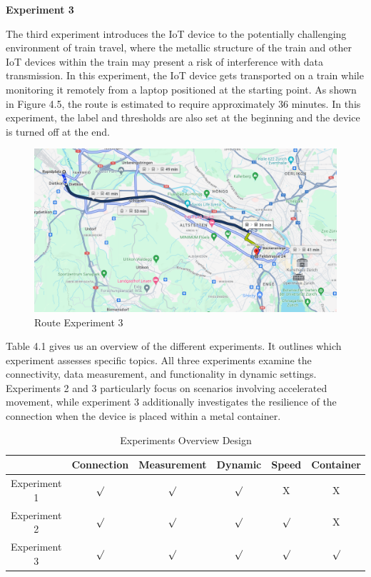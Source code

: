 \textbf{Experiment 3}

The third experiment introduces the IoT device to the potentially challenging environment of train travel, where the metallic structure of the train and other IoT devices within the train may present a risk of interference with data transmission. In this experiment, the IoT device gets transported on a train while monitoring it remotely from a laptop positioned at the starting point. As shown in Figure 4.5, the route is estimated to require approximately 36 minutes. In this experiment, the label and thresholds are also set at the beginning and the device is turned off at the end.

\begin{figure}[H]
    \centering
    \includegraphics[width=\linewidth]{exp3_route.png}
    \caption{Route Experiment 3}
    \label{fig:Route Experiment 3}
\end{figure}

Table 4.1 gives us an overview of the different experiments.
It outlines which experiment assesses specific topics. All three experiments examine the connectivity, data measurement, and functionality in dynamic settings. Experiments 2 and 3 particularly focus on scenarios involving accelerated movement, while experiment 3 additionally investigates the resilience of the connection when the device is placed within a metal container.


\begin{table}[H]
    \centering
    \begin{tabular}{c|c|c|c|c|c}
         & Connection & Measurement & Dynamic & Speed & Container\\
         \hline
        Experiment 1 & $\surd$ & $\surd$ & $\surd$ & X & X\\
        \hline
        Experiment 2 & $\surd$ & $\surd$ & $\surd$ & $\surd$ & X\\
        \hline
        Experiment 3 & $\surd$ & $\surd$ & $\surd$ & $\surd$ & $\surd$\\
    \end{tabular}
    \caption{Experiments Overview Design}
    \label{tab:Experiments Overview Design}
\end{table}